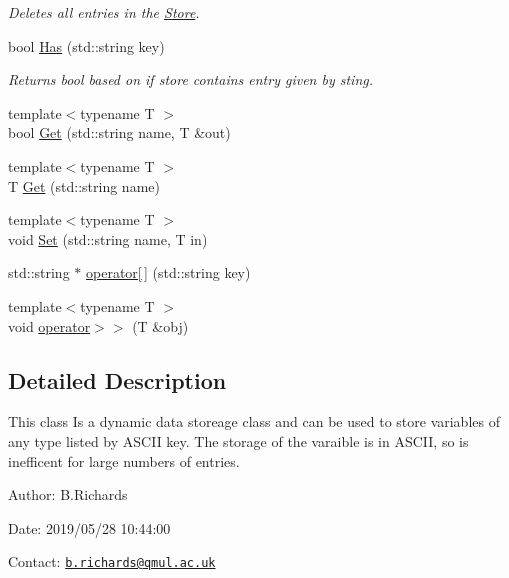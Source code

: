 \begin{DoxyCompactItemize}
\begin{DoxyCompactList}\small\item\em Deletes all entries in the \hyperlink{classStore}{Store}. \end{DoxyCompactList}\item 
bool \hyperlink{classStore_a41eaa81c4612fb5bdbf850afb6428977}{Has} (std\-::string key)
\begin{DoxyCompactList}\small\item\em Returns bool based on if store contains entry given by sting. \end{DoxyCompactList}\item 
{\footnotesize template$<$typename T $>$ }\\bool \hyperlink{classStore_abdc0134daa34b808328070f5d6b295f3}{Get} (std\-::string name, T \&out)
\item 
{\footnotesize template$<$typename T $>$ }\\T \hyperlink{classStore_a26d26db839f734e0af5404b7dac40dae}{Get} (std\-::string name)
\item 
{\footnotesize template$<$typename T $>$ }\\void \hyperlink{classStore_af586739813ce18da6f5e3561d134a814}{Set} (std\-::string name, T in)
\item 
std\-::string $\ast$ \hyperlink{classStore_a790ca02bc7d11648edf0c8d5df3751fe}{operator\mbox{[}$\,$\mbox{]}} (std\-::string key)
\item 
{\footnotesize template$<$typename T $>$ }\\void \hyperlink{classStore_abe9b65d1308c43dc4158b00d6aed7385}{operator$>$$>$} (T \&obj)
\end{DoxyCompactItemize}


\subsection{Detailed Description}
This class Is a dynamic data storeage class and can be used to store variables of any type listed by A\-S\-C\-I\-I key. The storage of the varaible is in A\-S\-C\-I\-I, so is inefficent for large numbers of entries.

\begin{DoxyParagraph}{Author\-:}
B.\-Richards 
\end{DoxyParagraph}
\begin{DoxyParagraph}{Date\-:}
2019/05/28 10\-:44\-:00 
\end{DoxyParagraph}
Contact\-: \href{mailto:b.richards@qmul.ac.uk}{\tt b.\-richards@qmul.\-ac.\-uk} 

